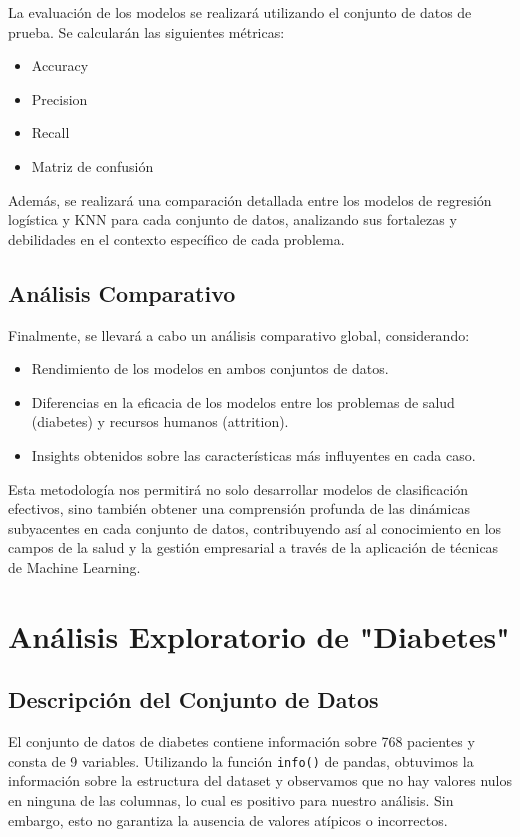 \documentclass[conference]{IEEEtran}
\begin{document}
La evaluación de los modelos se realizará utilizando el conjunto de datos de prueba. Se calcularán las siguientes métricas:

\begin{itemize}
    \item Accuracy
    \item Precision
    \item Recall
    \item Matriz de confusión
\end{itemize}

Además, se realizará una comparación detallada entre los modelos de regresión logística y KNN para cada conjunto de datos, analizando sus fortalezas y debilidades en el contexto específico de cada problema.

\subsection{Análisis Comparativo}

Finalmente, se llevará a cabo un análisis comparativo global, considerando:

\begin{itemize}
    \item Rendimiento de los modelos en ambos conjuntos de datos.
    \item Diferencias en la eficacia de los modelos entre los problemas de salud (diabetes) y recursos humanos (attrition).
    \item Insights obtenidos sobre las características más influyentes en cada caso.
\end{itemize}

Esta metodología nos permitirá no solo desarrollar modelos de clasificación efectivos, sino también obtener una comprensión profunda de las dinámicas subyacentes en cada conjunto de datos, contribuyendo así al conocimiento en los campos de la salud y la gestión empresarial a través de la aplicación de técnicas de Machine Learning.

\section{Análisis Exploratorio de "Diabetes"}

\subsection{Descripción del Conjunto de Datos}

El conjunto de datos de diabetes contiene información sobre 768 pacientes y consta de 9 variables. Utilizando la función \texttt{info()} de pandas, obtuvimos la información sobre la estructura del dataset y observamos que no hay valores nulos en ninguna de las columnas, lo cual es positivo para nuestro análisis. Sin embargo, esto no garantiza la ausencia de valores atípicos o incorrectos.
\end{document}
